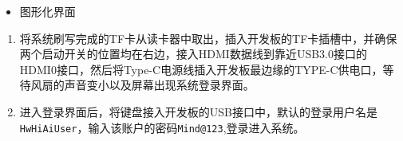 \begin{itemize}
\tightlist
\item
  图形化界面
\end{itemize}

\begin{enumerate}
\def\labelenumi{\arabic{enumi}.}
\tightlist
\item
  将系统刷写完成的TF卡从读卡器中取出，插入开发板的TF卡插槽中，并确保两个启动开关的位置均在右边，接入HDMI数据线到靠近USB3.0接口的HDMI0接口，然后将Type-C电源线插入开发板最边缘的TYPE-C供电口，等待风扇的声音变小以及屏幕出现系统登录界面。
\item
  进入登录界面后，将键盘接入开发板的USB接口中，默认的登录用户名是\passthrough{\lstinline!HwHiAiUser!}，输入该账户的密码\passthrough{\lstinline!Mind@123!},登录进入系统。

\end{enumerate}
